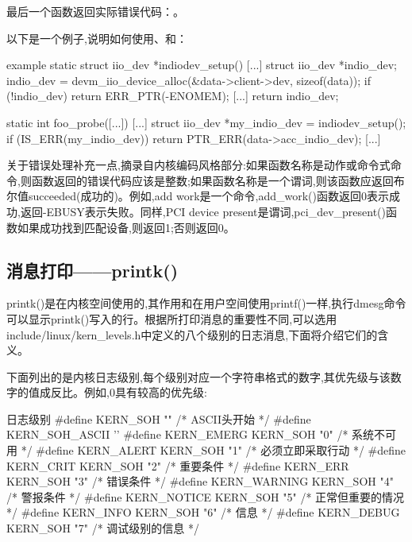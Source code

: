 \documentclass[lang=cn,newtx,10pt,scheme=chinese]{elegantbook}
\begin{document}
最后一个函数返回实际错误代码：。

以下是一个例子,说明如何使用、和：

\begin{mycode}{example}
static struct iio_dev *indiodev_setup(){
    [...]
    struct iio_dev *indio_dev;
    indio_dev = devm_iio_device_alloc(&data->client->dev, sizeof(data));
    if (!indio_dev)
        return ERR_PTR(-ENOMEM);
    [...]
    return indio_dev;
}

static int foo_probe([...]){
    [...]
    struct iio_dev *my_indio_dev = indiodev_setup();
    if (IS_ERR(my_indio_dev))
        return PTR_ERR(data->acc_indio_dev);
    [...]
}
\end{mycode}

\begin{marker}
关于错误处理补充一点,摘录自内核编码风格部分:如果函数名称是动作或命令式命令,则函数返回的错误代码应该是整数;如果函数名称是一个谓词,则该函数应返回布尔值succeeded(成功的)。例如,add
work是一个命令,add\_work()函数返回0表示成功,返回-EBUSY表示失败。同样,PCI device present是谓词,pci\_dev\_present()函数如果成功找到匹配设备,则返回1;否则返回0。
\end{marker}

\subsection{消息打印——printk()}

printk()是在内核空间使用的,其作用和在用户空间使用printf()一样,执行dmesg命令可以显示printk()写入的行。根据所打印消息的重要性不同,可以选用include/linux/kern\_levels.h中定义的八个级别的日志消息,下面将介绍它们的含义。

下面列出的是内核日志级别,每个级别对应一个字符串格式的数字,其优先级与该数字的值成反比。例如,0具有较高的优先级:

\begin{mycode}{日志级别}
#define KERN_SOH                ""          /* ASCII头开始 */
#define KERN_SOH_ASCII          ''
#define KERN_EMERG              KERN_SOH "0"    /* 系统不可用 */
#define KERN_ALERT              KERN_SOH "1"    /* 必须立即采取行动 */
#define KERN_CRIT               KERN_SOH "2"    /* 重要条件 */
#define KERN_ERR                KERN_SOH "3"    /* 错误条件 */
#define KERN_WARNING            KERN_SOH "4"    /* 警报条件 */
#define KERN_NOTICE             KERN_SOH "5"    /* 正常但重要的情况 */
#define KERN_INFO               KERN_SOH "6"    /* 信息 */
#define KERN_DEBUG              KERN_SOH "7"    /* 调试级别的信息 */
\end{mycode}
\end{document}
